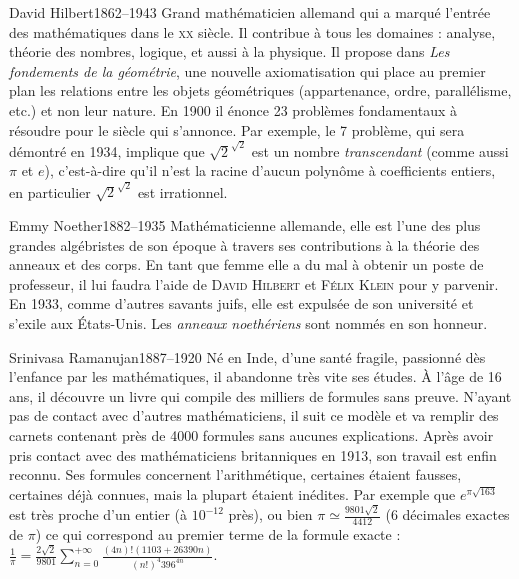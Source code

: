 \documentclass[10pt,class=article,crop=false]{standalone}
\begin{document}
\begin{multicols}{2}
\begin{biographie}{David Hilbert}{1862--1943}
Grand mathématicien allemand qui a marqué l'entrée des mathématiques dans le \textsc{xx}\ieme{} siècle.  Il contribue à tous les domaines : analyse, théorie des nombres, logique, et aussi à la physique.
Il propose dans \emph{Les fondements de la géométrie},  une nouvelle axiomatisation qui place au premier plan les relations entre les objets géométriques (appartenance, ordre, parallélisme, etc.) et non leur nature.
En 1900 il énonce 23 problèmes fondamentaux à résoudre pour le siècle qui s'annonce. Par exemple, le 7\ieme{} problème, qui sera démontré en 1934, implique que $\sqrt{2}^{\sqrt{2}}$ est un nombre \emph{transcendant} (comme aussi $\pi$ et $e$), c'est-à-dire qu'il n'est la racine d'aucun polynôme à coefficients entiers, en particulier $\sqrt{2}^{\sqrt{2}}$ est irrationnel.
\end{biographie}


\begin{biographie}{Emmy Noether}{1882--1935}
Mathématicienne allemande, elle est l'une des plus grandes algébristes de son époque à travers ses contributions à la théorie des anneaux et des corps.
En tant que femme elle a du mal à obtenir un poste de professeur, il lui faudra l'aide de \textsc{David Hilbert} et \textsc{Félix Klein} pour y parvenir. En 1933, comme d'autres savants juifs, elle est expulsée de son université et s'exile aux États-Unis. Les \emph{anneaux noethériens} sont nommés en son honneur.
\end{biographie}	


\begin{biographie}{Srinivasa Ramanujan}{1887--1920}
Né en Inde, d'une santé fragile, passionné dès l'enfance par les mathématiques, il abandonne très vite ses études. À l'âge de 16 ans, il découvre un livre qui compile des milliers de formules sans preuve. N'ayant pas de contact avec d'autres mathématiciens, il suit ce modèle et va remplir des carnets contenant près de 4000 formules sans aucunes explications. Après avoir pris contact avec des mathématiciens britanniques en 1913, son travail est enfin reconnu. Ses formules concernent l'arithmétique, certaines étaient fausses, certaines déjà connues, mais la plupart étaient inédites. Par exemple que $e^{\pi\sqrt{163}}$ est très proche d'un entier (à $10^{-12}$ près), 
ou bien $\pi \simeq \frac{9801\sqrt{2}}{4412}$ ($6$ décimales exactes de $\pi$) ce qui correspond au premier terme de la formule exacte :
$\frac{1}{\pi}  = \frac{2\sqrt{2}}{9801} 
\sum_{n=0}^{+\infty} \frac{(4n)! (1103 + 26390n)}{(n!)^4 396^{4n}}$.
\end{biographie}



\end{multicols}
\end{document}
